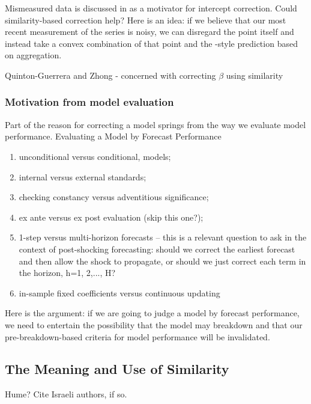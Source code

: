 \documentclass[11pt]{article}
\theoremstyle{definition}
\begin{document}
Mismeasured data is discussed in \cite[p. 166]{hendry1994theory} as a motivator for intercept correction.  Could similarity-based correction help?  Here is an idea: if we believe that our most recent measurement of the series is noisy, we can disregard the point itself and instead take a convex combination of that point and the \cite{lin2021minimizing}-style prediction based on aggregation.

Quinton-Guerrera and Zhong \cite{guerron2017macroeconomic} - concerned with correcting $\beta$ using similarity\\

\subsubsection{Motivation from model evaluation}

Part of the reason for correcting a model springs from the way we evaluate model performance.
Evaluating a Model by Forecast Performance \cite{clements2005evaluating}
\begin{enumerate}

  \item   unconditional versus conditional, models;
  \item internal versus external standards;
  \item checking constancy versus adventitious significance;
  \item ex ante versus ex post evaluation (skip this one?);
  \item 1-step versus multi-horizon forecasts -- this is a relevant question to ask in the context of post-shocking forecasting: should we correct the earliest forecast and then allow the shock to propagate, or should we just correct each term in the horizon, h=1, 2,..., H?
  \item in-sample fixed coefficients versus continuous updating
\end{enumerate}

Here is the argument: if we are going to judge a model by forecast performance, we need to entertain the possibility that the model may breakdown and that our pre-breakdown-based criteria for model performance will be invalidated.

\subsection{The Meaning and Use of Similarity}\label{meaning_use}
Hume? Cite Israeli authors, if so.\\
\end{document}
